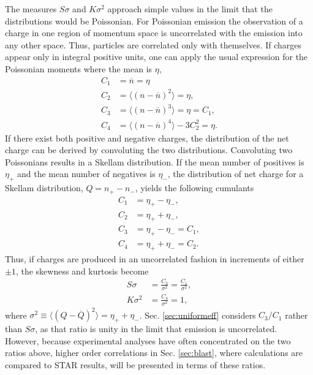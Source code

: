 The measures $S\sigma$ and $K\sigma^2$ approach simple values in the limit that the distributions would be Poissonian. For Poissonian emission the observation of a charge in one region of momentum space is uncorrelated with the emission into any other space. Thus, particles are correlated only with themselves. If charges appear only in integral positive units, one can apply the usual expression for the Poissonian moments where the mean is $\eta$, 
\begin{align}
C_1&=\overline{n}=\eta\\ \nonumber
C_2&=\langle(n-\overline{n})^2\rangle=\eta,\\ \nonumber
C_3&=\langle(n-\overline{n})^3\rangle=\eta=C_1,\\ \nonumber
C_4&=\langle(n-\overline{n})^4\rangle-3C_2^2=\eta. \nonumber
\end{align}
If there exist both positive and negative charges, the distribution of the net charge can be derived by convoluting the two distributions. Convoluting two Poissonians results in a Skellam distribution. If the mean number of positives is $\eta_+$ and the mean number of negatives is $\eta_-$, the distribution of net charge for a Skellam distribution, $Q=n_+-n_-$, yields the following cumulants
\begin{align}
\label{eq:skellam}
C_1&=\eta_+-\eta_-,\\ \nonumber
C_2&=\eta_++\eta_-,\\ \nonumber
C_3&=\eta_+-\eta_-=C_1,\\ \nonumber
C_4&=\eta_++\eta_-=C_2. \nonumber
\end{align}
Thus, if charges are produced in an uncorrelated fashion in increments of either $\pm 1$, the skewness and kurtosis become
\begin{eqnarray}
S\sigma&=\frac{C_3}{\sigma^2}=\frac{C_1}{\sigma^2},\\ \nonumber
K\sigma^2&=\frac{C_4}{\sigma^2}=1, \nonumber
\end{eqnarray}
where $\sigma^2\equiv\langle(Q-\overline{Q})^2\rangle=\eta_++\eta_-$. Sec. \ref{sec:uniformeff} considers $C_3/C_1$ rather than $S\sigma$, as that ratio is unity in the limit that emission is uncorrelated. However, because experimental analyses have often concentrated on the two ratios above, higher order correlations in Sec. \ref{sec:blast}, where calculations are compared to STAR results, will be presented in terms of these ratios.


